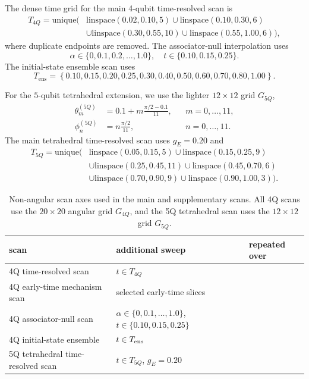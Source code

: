 \documentclass[aps,physrev,preprint,groupedaddress]{revtex4-2}
\begin{document}
The dense time grid for the main 4-qubit time-resolved scan is
\begin{align}
T_{4Q} = {\mathrm{unique}}
\big(&{\mathrm{linspace}}(0.02,0.10,5)\cup{\mathrm{linspace}}(0.10,0.30,6)\nonumber\\
&\cup{\mathrm{linspace}}(0.30,0.55,10)\cup{\mathrm{linspace}}(0.55,1.00,6)\big),
\end{align}
where duplicate endpoints are removed. The associator-null interpolation uses
\begin{equation}
    \alpha\in\{0,0.1,0.2,\ldots,1.0\}, \quad t\in\{0.10,0.15,0.25\}.
\end{equation}
The initial-state ensemble scan uses
\begin{equation}
    T_{\mathrm{ens}} = \left\{0.10,0.15,0.20,0.25,0.30,0.40,0.50,0.60,0.70,0.80,1.00\right\}.
\end{equation}

For the $5$-qubit tetrahedral extension, we use the lighter $12\times12$ grid $G_{5Q}$,
\begin{equation}
\begin{aligned}
    \theta_m^{(5Q)} &= 0.1+m\frac{\pi/2-0.1}{11}, &&m=0,\ldots,11,\\ 
    \phi_n^{(5Q)} &= n\frac{\pi/2}{11}, &&n=0,\ldots,11.
\end{aligned}
\end{equation}
The main tetrahedral time-resolved scan uses $g_E=0.20$ and
\begin{align}
T_{5Q} = {\mathrm{unique}}
\big(&{\mathrm{linspace}}(0.05,0.15,5)\cup{\mathrm{linspace}}(0.15,0.25,9)\nonumber\\
&\cup{\mathrm{linspace}}(0.25,0.45,11)\cup{\mathrm{linspace}}(0.45,0.70,6)\nonumber\\
&\cup{\mathrm{linspace}}(0.70,0.90,9)\cup{\mathrm{linspace}}(0.90,1.00,3)\big).
\end{align}

\begin{table}[h]
\centering
\caption{Non-angular scan axes used in the main and supplementary scans.
All 4Q scans use the \(20\times20\) angular grid \(G_{4Q}\), and the
5Q tetrahedral scan uses the \(12\times12\) grid \(G_{5Q}\).}
\label{tab:scan_grids}
\begin{tabular}{l|l|l}
\hline
scan & additional sweep & repeated over \\
\hline
4Q time-resolved scan & \(t\in T_{4Q}\) \\
4Q early-time mechanism scan & selected early-time slices \\
4Q associator-null scan & \(\alpha\in\{0,0.1,\ldots,1.0\}\), \(t\in\{0.10,0.15,0.25\}\) \\
4Q initial-state ensemble & \(t\in T_{\rm ens}\) \\
5Q tetrahedral time-resolved scan & \(t\in T_{5Q}\), \(g_E=0.20\)  \\
\hline
\end{tabular}
\end{table}
\end{document}
